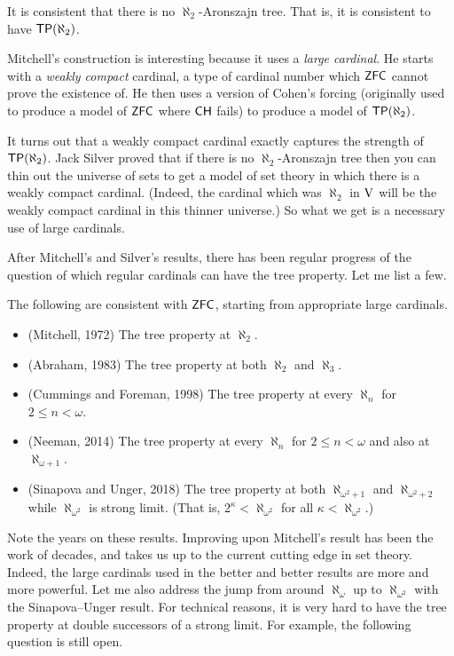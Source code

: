 \documentclass[10pt]{amsart}
\newcommand\TP{\axiom{TP}}
\begin{document}
\begin{theorem}[Mitchell, 1972]
It is consistent that there is no $\aleph_2$-Aronszajn tree. That is, it is consistent to have $\TP(\aleph_2)$.
\end{theorem}

Mitchell's construction is interesting because it uses a \emph{large cardinal}. He starts with a \emph{weakly compact} cardinal, a type of cardinal number which $\mathsf{ZFC}$ cannot prove the existence of. He then uses a version of Cohen's forcing (originally used to produce a model of $\mathsf{ZFC}$ where $\mathsf{CH}$ fails) to produce a model of $\TP(\aleph_2)$. 

It turns out that a weakly compact cardinal exactly captures the strength of $\TP(\aleph_2)$. Jack Silver proved that if there is no $\aleph_2$-Aronszajn tree then you can thin out the universe of sets to get a model of set theory in which there is a weakly compact cardinal. (Indeed, the cardinal which was $\aleph_2$ in $\mathrm{V}$ will be the weakly compact cardinal in this thinner universe.) So what we get is a necessary use of large cardinals.

After Mitchell's and Silver's results, there has been regular progress of the question of which regular cardinals can have the tree property. Let me list a few.

\begin{theorem}
The following are consistent with $\mathsf{ZFC}$, starting from appropriate large cardinals.
\begin{itemize}
\item (Mitchell, 1972) The tree property at $\aleph_2$.
\item (Abraham, 1983) The tree property at both $\aleph_2$ and $\aleph_3$.
\item (Cummings and Foreman, 1998) The tree property at every $\aleph_n$ for $2 \le n < \omega$.
\item (Neeman, 2014) The tree property at every $\aleph_n$ for $2 \le n < \omega$ and also at $\aleph_{\omega+1}$.
\item (Sinapova and Unger, 2018) The tree property at both $\aleph_{\omega^2+1}$ and $\aleph_{\omega^2+2}$ while $\aleph_{\omega^2}$ is strong limit. (That is, $2^\kappa < \aleph_{\omega^2}$ for all $\kappa < \aleph_{\omega^2}$.)
\end{itemize}
\end{theorem}

Note the years on these results. Improving upon Mitchell's result has been the work of decades, and takes us up to the current cutting edge in set theory. Indeed, the large cardinals used in the better and better results are more and more powerful. Let me also address the jump from around $\aleph_\omega$ up to $\aleph_{\omega^2}$ with the Sinapova--Unger result. For technical reasons, it is very hard to have the tree property at double successors of a strong limit. For example, the following question is still open.
\end{document}
